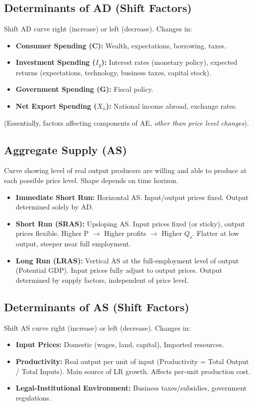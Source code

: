 \documentclass{article}
\begin{document}
\subsection*{Determinants of AD (Shift Factors)}
Shift AD curve right (increase) or left (decrease). Changes in:
\begin{itemize}
    \item \textbf{Consumer Spending (C):} Wealth, expectations, borrowing, taxes.
    \item \textbf{Investment Spending ($I_g$):} Interest rates (monetary policy), expected returns (expectations, technology, business taxes, capital stock).
    \item \textbf{Government Spending (G):} Fiscal policy.
    \item \textbf{Net Export Spending ($X_n$):} National income abroad, exchange rates.
\end{itemize}
(Essentially, factors affecting components of AE, \textit{other than price level changes}).

\subsection*{Aggregate Supply (AS)}
Curve showing level of real output producers are willing and able to produce at each possible price level. Shape depends on time horizon.
\begin{itemize}
    \item \textbf{Immediate Short Run:} Horizontal AS. Input/output prices fixed. Output determined solely by AD.
    \item \textbf{Short Run (SRAS):} Upsloping AS. Input prices fixed (or sticky), output prices flexible. Higher P $\rightarrow$ Higher profits $\rightarrow$ Higher $Q_s$. Flatter at low output, steeper near full employment.
    \item \textbf{Long Run (LRAS):} Vertical AS at the full-employment level of output (Potential GDP). Input prices fully adjust to output prices. Output determined by supply factors, independent of price level.
\end{itemize}

\subsection*{Determinants of AS (Shift Factors)}
Shift AS curve right (increase) or left (decrease). Changes in:
\begin{itemize}
    \item \textbf{Input Prices:} Domestic (wages, land, capital), Imported resources.
    \item \textbf{Productivity:} Real output per unit of input (Productivity = Total Output / Total Inputs). Main source of LR growth. Affects per-unit production cost.
    \item \textbf{Legal-Institutional Environment:} Business taxes/subsidies, government regulations.
\end{itemize}
\end{document}
